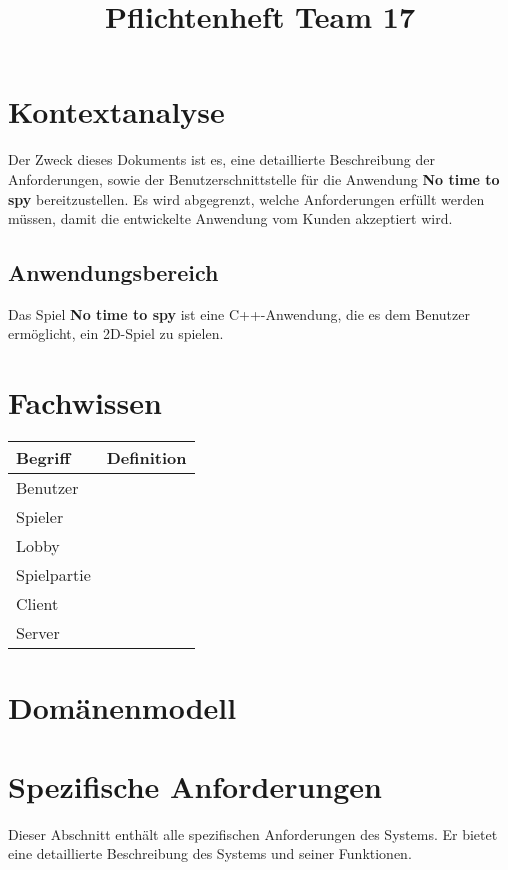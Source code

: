 \documentclass{uulm-assignment}
\title{Pflichtenheft Team 17}
\begin{document}
\maketitle

\listoftodos

\section{Kontextanalyse}
Der Zweck dieses Dokuments ist es, eine detaillierte Beschreibung der Anforderungen, sowie der
Benutzerschnittstelle für die Anwendung \textbf{No time to spy} bereitzustellen. Es wird abgegrenzt, welche
Anforderungen erfüllt werden müssen, damit die entwickelte Anwendung vom Kunden akzeptiert
wird.

\subsection{Anwendungsbereich}

Das Spiel \textbf{No time to spy} ist eine C++-Anwendung, die es dem Benutzer ermöglicht, ein 2D-Spiel zu spielen.


\section{Fachwissen}


\begin{tabularx}{16cm}{l|X}
\textbf{Begriff} & \textbf{Definition} \\
\hline
Benutzer & \\ 
\hline
Spieler & \\ 
\hline
Lobby & \\ 
\hline
Spielpartie & \\ 
\hline
Client & \\ 
\hline
Server & \\ 
\end{tabularx}


\section{Domänenmodell}







\section{Spezifische Anforderungen}
Dieser Abschnitt enthält alle spezifischen Anforderungen des Systems. Er bietet eine detaillierte
Beschreibung des Systems und seiner Funktionen.
\end{document}
